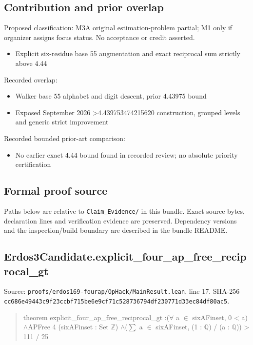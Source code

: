 \documentclass[11pt,a4paper]{article}
\begin{document}
\subsection{Contribution and prior overlap}
Proposed classification: M3A original estimation-problem partial; M1 only if organizer assigns focus status. No acceptance or credit asserted.

\begin{itemize}
\item Explicit six-residue base 55 augmentation and exact reciprocal sum strictly above 4.44
\end{itemize}
Recorded overlap:

\begin{itemize}
\item Walker base 55 alphabet and digit descent, prior 4.43975 bound
\end{itemize}
\begin{itemize}
\item Exposed September 2026 >4.439753474215620 construction, grouped levels and generic strict improvement
\end{itemize}
Recorded bounded prior-art comparison:

\begin{itemize}
\item No earlier exact 4.44 bound found in recorded review; no absolute priority certification
\end{itemize}
\subsection{Formal proof source}
Paths below are relative to \texttt{Claim\_Evidence/} in this bundle. Exact source bytes, declaration lines and verification evidence are preserved. Dependency versions and the inspection/build boundary are described in the bundle README.

\subsection{Erdos3Candidate.explicit\_four\_ap\_free\_reciprocal\_gt}
Source: \texttt{proofs/erdos169-fourap/OpHack/MainResult.lean}, line 17. SHA-256 \texttt{cc686e49443c9f23ccbf715be6e9cf71c528736794df230771d33ec84df80ac5}.

\begin{quote}\small\ttfamily theorem explicit\_four\_ap\_free\_reciprocal\_gt :\newline (\ensuremath{\forall} a \ensuremath{\in} sixAFinset, 0 < a) \ensuremath{\wedge}\newline APFree 4 (sixAFinset : Set \ensuremath{\mathbb{Z}}) \ensuremath{\wedge}\newline (\ensuremath{\sum} a \ensuremath{\in} sixAFinset, (1 : \ensuremath{\mathbb{Q}}) / (a : \ensuremath{\mathbb{Q}})) > 111 / 25\end{quote}
\end{document}

